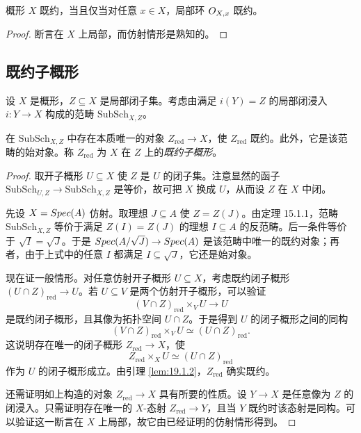 \begin{lemma}\label{lem:19.1.4}
概形 $X$ 既约，当且仅当对任意 $x\in X$，局部环 $O_{X,x}$ 既约。
\end{lemma}

\begin{proof}
断言在 $X$ 上局部，而仿射情形是熟知的。
\end{proof}

\subsection{既约子概形}\label{sec:19.2}

设 $X$ 是概形，$Z\subseteq X$ 是局部闭子集。考虑由满足 $i(Y)=Z$ 的局部闭浸入 $i:Y\to X$ 构成的范畴 $\mathrm{SubSch}_{X,Z}$。

\begin{propdef}\label{prop:19.2.1}
在 $\mathrm{SubSch}_{X,Z}$ 中存在本质唯一的对象 $Z_{\mathrm{red}}\to X$，使 $Z_{\mathrm{red}}$ 既约。此外，它是该范畴的始对象。称 $Z_{\mathrm{red}}$ 为 $X$ 在 $Z$ 上的\emph{既约子概形}。
\end{propdef}

\begin{proof}
取开子概形 $U\subseteq X$ 使 $Z$ 是 $U$ 的闭子集。注意显然的函子 $\mathrm{SubSch}_{U,Z}\to\mathrm{SubSch}_{X,Z}$ 是等价，故可把 $X$ 换成 $U$，从而设 $Z$ 在 $X$ 中闭。

先设 $X=Spec(A)$ 仿射。取理想 $J\subseteq A$ 使 $Z=Z(J)$。由定理 15.1.1，范畴 $\mathrm{SubSch}_{X,Z}$ 等价于满足 $Z(I)=Z(J)$ 的理想 $I\subseteq A$ 的反范畴。后一条件等价于 $\sqrt{I}=\sqrt{J}$。于是 $Spec(A/\sqrt{J})\to Spec(A)$ 是该范畴中唯一的既约对象；再者，由于上式中的任意 $I$ 都满足 $I\subseteq\sqrt{J}$，它还是始对象。

现在证一般情形。对任意仿射开子概形 $U\subseteq X$，考虑既约闭子概形 $(U\cap Z)_{\mathrm{red}}\to U$。若 $U\subseteq V$ 是两个仿射开子概形，可以验证
\[
(V\cap Z)_{\mathrm{red}}\times_V U\to U
\]
是既约闭子概形，且其像为拓扑空间 $U\cap Z$。于是得到 $U$ 的闭子概形之间的同构
\[
(V\cap Z)_{\mathrm{red}}\times_V U\simeq(U\cap Z)_{\mathrm{red}}.
\]
这说明存在唯一的闭子概形 $Z_{\mathrm{red}}\to X$，使
\[
Z_{\mathrm{red}}\times_X U\simeq(U\cap Z)_{\mathrm{red}}
\]
作为 $U$ 的闭子概形成立。由引理 \ref{lem:19.1.2}，$Z_{\mathrm{red}}$ 确实既约。

还需证明如上构造的对象 $Z_{\mathrm{red}}\to X$ 具有所要的性质。设 $Y\to X$ 是任意像为 $Z$ 的闭浸入。只需证明存在唯一的 $X$-态射 $Z_{\mathrm{red}}\to Y$，且当 $Y$ 既约时该态射是同构。可以验证这一断言在 $X$ 上局部，故它由已经证明的仿射情形得到。
\end{proof}

